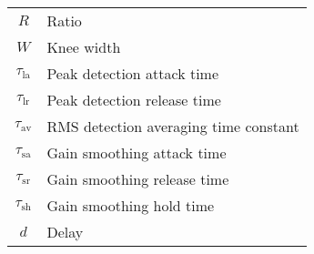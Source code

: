 \documentclass[../main2.tex]{subfiles}
\begin{document}
\begin{table}[h]
\begin{center}
\begin{tabular}{| c | l |}
	$R$ & Ratio \\
	$W$ & Knee width \\
	$\tau_\text{la}$ & Peak detection attack time \\
	$\tau_\text{lr}$ & Peak detection release time \\
	$\tau_\text{av}$ & RMS detection averaging time constant\\
	$\tau_\text{sa}$ & Gain smoothing attack time \\
	$\tau_\text{sr}$ & Gain smoothing release time \\
	$\tau_\text{sh}$ & Gain smoothing hold time \\
	$d$ & Delay \\
	\hline
\end{tabular}
\end{center}

\end{table}
\end{document}
